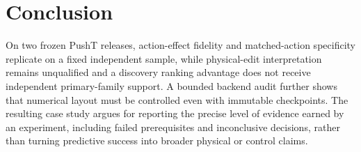 \section{Conclusion}
\label{sec:conclusion}
On two frozen PushT releases, action-effect fidelity and matched-action
specificity replicate on a fixed independent sample, while physical-edit
interpretation remains unqualified and a discovery ranking advantage does not
receive independent primary-family support. A bounded backend audit further
shows that numerical layout must be controlled even with immutable checkpoints.
The resulting case study argues for reporting the precise level of evidence
earned by an experiment, including failed prerequisites and inconclusive
decisions, rather than turning predictive success into broader physical or
control claims.